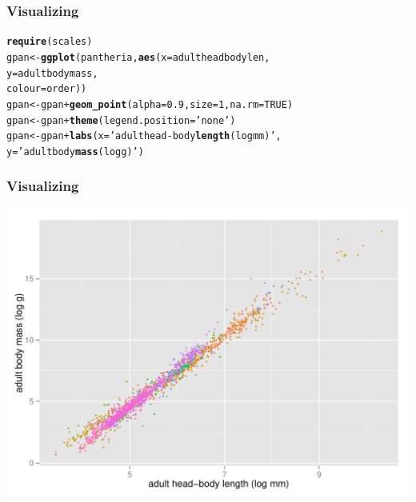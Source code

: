 \documentclass{beamer}\usepackage{graphicx, color}
\makeatletter
\def\maxwidth{ %
  \ifdim\Gin@nat@width>\linewidth
    \linewidth
  \else
    \Gin@nat@width
  \fi
}
\newcommand{\hlfunctioncall}[1]{\textcolor[rgb]{0.501960784313725,0,0.329411764705882}{\textbf{#1}}}%
\newcommand{\hlstring}[1]{\textcolor[rgb]{0.6,0.6,1}{#1}}%
\newenvironment{kframe}{%
 \def\at@end@of@kframe{}%
 \ifinner\ifhmode%
  \def\at@end@of@kframe{\end{minipage}}%
  \begin{minipage}{\columnwidth}%
 \fi\fi%
 \def\FrameCommand##1{\hskip\@totalleftmargin \hskip-\fboxsep
 \colorbox{shadecolor}{##1}\hskip-\fboxsep
     \hskip-\linewidth \hskip-\@totalleftmargin \hskip\columnwidth}%
 \MakeFramed {\advance\hsize-\width
   \@totalleftmargin\z@ \linewidth\hsize
   \@setminipage}}%
 {\par\unskip\endMakeFramed%
 \at@end@of@kframe}
\newenvironment{knitrout}{}{} %
\makeatother
\begin{document}
\begin{frame}[fragile]
  \frametitle{Visualizing}
\begin{knitrout}\scriptsize
{}\color{fgcolor}\begin{kframe}
\begin{alltt}
\hlfunctioncall{require}(scales)
gpan <- \hlfunctioncall{ggplot}(pantheria, \hlfunctioncall{aes}(x = adultheadbodylen,
                              y = adultbodymass,
                              colour = order))
gpan <- gpan + \hlfunctioncall{geom_point}(alpha = 0.9,  size = 1, na.rm = TRUE)
gpan <- gpan + \hlfunctioncall{theme}(legend.position = \hlstring{'none'})
gpan <- gpan + \hlfunctioncall{labs}(x = \hlstring{'adult head-body \hlfunctioncall{length} (log mm)'},
                    y = \hlstring{'adult body \hlfunctioncall{mass} (log g)'})
\end{alltt}
\end{kframe}
\end{knitrout}

\end{frame}

\begin{frame}[fragile]
  \frametitle{Visualizing}
\begin{knitrout}\scriptsize
{}\color{fgcolor}
\includegraphics[width=\maxwidth]{figure/unnamed-chunk-21} 

\end{knitrout}

\end{frame}
\end{document}
